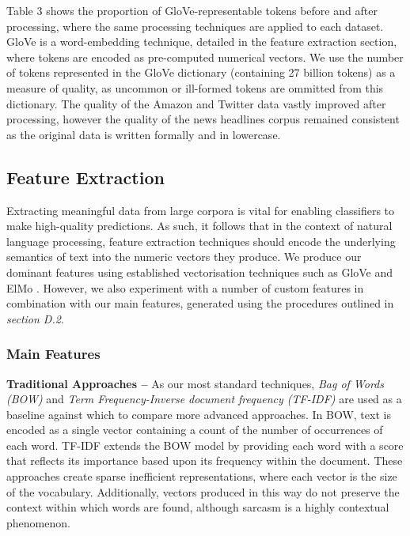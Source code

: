 \documentclass[12pt,a4paper]{article}
\begin{document}
\noindent Table 3 shows the proportion of GloVe-representable tokens before and after processing, where the same processing techniques are applied to each dataset. GloVe is a word-embedding technique, detailed in the feature extraction section, where tokens are encoded as pre-computed numerical vectors. We use the number of tokens represented in the GloVe dictionary (containing 27 billion tokens) as a measure of quality, as uncommon or ill-formed tokens are ommitted from this dictionary. The quality of the Amazon and Twitter data vastly improved after processing, however the quality of the news headlines corpus remained consistent as the original data is written formally and in lowercase.



\subsection{Feature Extraction}
\vspace{-4.2pt}
\noindent Extracting meaningful data from large corpora is vital for enabling classifiers to make high-quality predictions. As such, it follows that in the context of natural language processing, feature extraction techniques should encode the underlying semantics of text into the numeric vectors they produce. We produce our dominant features using established vectorisation techniques such as GloVe \cite{pennington2014glove} and ElMo \cite{peters2018deep}. However, we also experiment with a number of custom features in combination with our main features, generated using the procedures outlined in \textit{section D.2}. \vspace{-4.2pt}

\subsubsection{Main Features}
\noindent \textbf{Traditional Approaches --} As our most standard techniques, \textit{Bag of Words (BOW)} and \textit{Term Frequency-Inverse document frequency (TF-IDF)} \cite{robertson1976relevance} are used as a baseline against which to compare more advanced approaches. In BOW, text is encoded as a single vector containing a count of the number of occurrences of each word. TF-IDF extends the BOW model by providing each word with a score that reflects its importance based upon its frequency within the document. These approaches create sparse inefficient representations, where each vector is the size of the vocabulary. Additionally, vectors produced in this way do not preserve the context within which words are found, although sarcasm is a highly contextual phenomenon.\\
\end{document}
